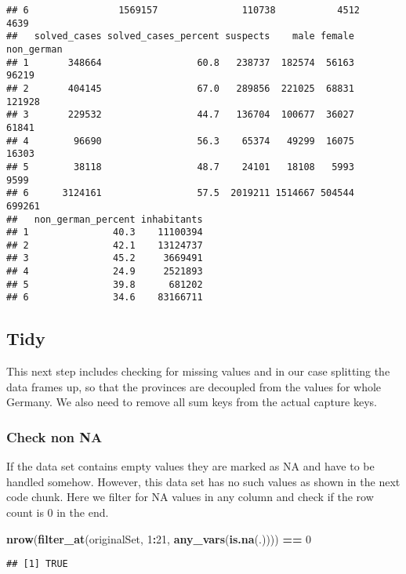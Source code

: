 \documentclass[
]{article}
\newenvironment{Shaded}{\begin{snugshade}}{\end{snugshade}}
\newcommand{\DecValTok}[1]{\textcolor[rgb]{0.00,0.00,0.81}{#1}}
\newcommand{\KeywordTok}[1]{\textcolor[rgb]{0.13,0.29,0.53}{\textbf{#1}}}
\newcommand{\NormalTok}[1]{#1}
\newcommand{\OperatorTok}[1]{\textcolor[rgb]{0.81,0.36,0.00}{\textbf{#1}}}
\newcommand{\StringTok}[1]{\textcolor[rgb]{0.31,0.60,0.02}{#1}}
\begin{document}
\begin{verbatim}
## 6                1569157               110738           4512     4639
##   solved_cases solved_cases_percent suspects    male female non_german
## 1       348664                 60.8   238737  182574  56163      96219
## 2       404145                 67.0   289856  221025  68831     121928
## 3       229532                 44.7   136704  100677  36027      61841
## 4        96690                 56.3    65374   49299  16075      16303
## 5        38118                 48.7    24101   18108   5993       9599
## 6      3124161                 57.5  2019211 1514667 504544     699261
##   non_german_percent inhabitants
## 1               40.3    11100394
## 2               42.1    13124737
## 3               45.2     3669491
## 4               24.9     2521893
## 5               39.8      681202
## 6               34.6    83166711
\end{verbatim}

\hypertarget{tidy}{%
\subsection{Tidy}\label{tidy}}

This next step includes checking for missing values and in our case
splitting the data frames up, so that the provinces are decoupled from
the values for whole Germany. We also need to remove all sum keys from
the actual capture keys.

\hypertarget{check-non-na}{%
\subsubsection{Check non NA}\label{check-non-na}}

If the data set contains empty values they are marked as NA and have to
be handled somehow. However, this data set has no such values as shown
in the next code chunk. Here we filter for NA values in any column and
check if the row count is 0 in the end.

\begin{Shaded}
\begin{Highlighting}[]
\KeywordTok{nrow}\NormalTok{(}\KeywordTok{filter_at}\NormalTok{(originalSet, }\DecValTok{1}\OperatorTok{:}\DecValTok{21}\NormalTok{, }\KeywordTok{any_vars}\NormalTok{(}\KeywordTok{is.na}\NormalTok{(.)))) }\OperatorTok{==}\StringTok{ }\DecValTok{0}
\end{Highlighting}
\end{Shaded}

\begin{verbatim}
## [1] TRUE
\end{verbatim}
\end{document}
